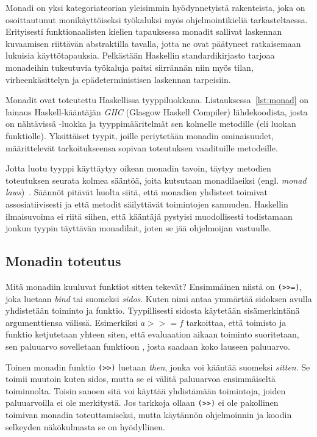 \documentclass[finnish]{tktltiki2}
\begin{document}
Monadi on yksi kategoriateorian yleisimmin hyödynnetyistä rakenteista, joka on osoittautunut
monikäyttöiseksi työkaluksi myös ohjelmointikieliä tarkasteltaessa. Erityisesti funktionaalisten
kielien tapauksessa monadit sallivat laskennan kuvaamisen riittävän abstraktilla tavalla, jotta ne
ovat päätyneet ratkaisemaan lukuisia käyttötapauksia. Pelkästään Haskellin standardikirjasto tarjoaa
monadeihin tukeutuvia työkaluja paitsi siirrännän niin myös tilan, virheenkäsittelyn ja
epädeterministisen laskennan tarpeisiin.

Monadit ovat toteutettu Haskellissa tyyppiluokkana. Listauksessa~\ref{lst:monad} on lainaus
Haskell-kääntäjän \emph{GHC} (Glasgow Haskell Compiler) lähdekoodista, josta on nähtävissä
-luokka ja tyyppimääritelmät sen kolmelle metodille (eli luokan funktiolle). Yksittäiset
tyypit, joille periytetään monadin ominaisuudet, määrittelevät tarkoitukseensa sopivan toteutuksen
vaadituille metodeille.

Jotta luotu tyyppi käyttäytyy oikean monadin tavoin, täytyy metodien toteutuksen seurata kolmea
sääntöä, joita kutsutaan monadilaeiksi (engl. \emph{monad laws})~\cite{teofp92}. Säännöt pitävät
huolta siitä, että monadien yhdisteet toimivat assosiatiivisesti ja että metodit säilyttävät
toimintojen samuuden. Haskellin ilmaisuvoima ei riitä siihen, että kääntäjä pystyisi muodollisesti
todistamaan jonkun tyypin täyttävän monadilait, joten se jää ohjelmoijan vastuulle.

\subsection{Monadin toteutus}

Mitä monadiin kuuluvat funktiot sitten tekevät? Ensimmäinen niistä on \verb|(>>=)|, joka luetaan
\emph{bind} tai suomeksi \emph{sidos}. Kuten nimi antaa ymmärtää sidoksen avulla yhdistetään
toiminto ja funktio. Tyypillisesti sidosta käytetään sisämerkintänä argumenttiensa välissä.
Esimerkiksi $a >>= f$ tarkoittaa, että toimisto  ja funktio  ketjutetaan yhteen
siten, että evaluaation aikaan toiminto  suoritetaan, sen paluuarvo sovelletaan funktioon
, josta saadaan koko lauseen paluuarvo.

Toinen monadin funktio \verb|(>>)| luetaan \emph{then}, jonka voi kääntää suomeksi \emph{sitten}. Se
toimii muutoin kuten sidos, mutta se ei välitä paluuarvoa ensimmäiseltä toiminnolta. Toisin sanoen
sitä voi käyttää yhdistämään toimintoja, joiden paluuarvoilla ei ole merkitystä. Jos tarkkoja ollaan
\verb|(>>)| ei ole pakollinen toimivan monadin toteuttamiseksi, mutta käytännön ohjelmoinnin ja
koodin selkeyden näkökulmasta se on hyödyllinen.
\end{document}
